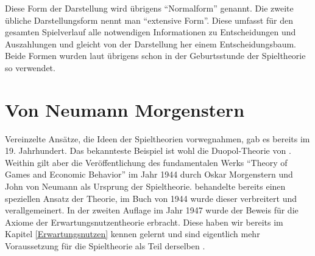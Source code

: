 
Diese Form der Darstellung wird übrigens "`Normalform"' genannt. Die zweite übliche Darstellungsform nennt man "`extensive Form"'. Diese umfasst für den gesamten Spielverlauf alle notwendigen Informationen zu Entscheidungen und Auszahlungen und gleicht von der Darstellung her einem Entscheidungsbaum. Beide Formen wurden laut \textcite{Selten2001} übrigens schon in der Geburtsstunde der Spieltheorie so verwendet.


\section{Von Neumann Morgenstern}

Vereinzelte Ansätze, die Ideen der Spieltheorien vorwegnahmen, gab es bereits im 19. Jahrhundert. Das bekannteste Beispiel ist wohl die Duopol-Theorie von \textcite{Cournot1836}. Weithin gilt aber die Veröffentlichung des fundamentalen Werks "`Theory of Games and Economic Behavior"' im Jahr 1944 durch Oskar Morgenstern und John von Neumann als Ursprung der Spieltheorie. \textcite{VonNeumann1928} behandelte bereits einen speziellen Ansatz der Theorie, im Buch von 1944 wurde dieser verbreitert und verallgemeinert. In der zweiten Auflage im Jahr 1947 wurde der Beweis für die Axiome der Erwartungsnutzentheorie erbracht. Diese haben wir bereits im Kapitel \ref{Erwartungsnutzen} kennen gelernt und sind eigentlich mehr Voraussetzung für die Spieltheorie als Teil derselben \parencite[S. 3]{Selten2001}. 

